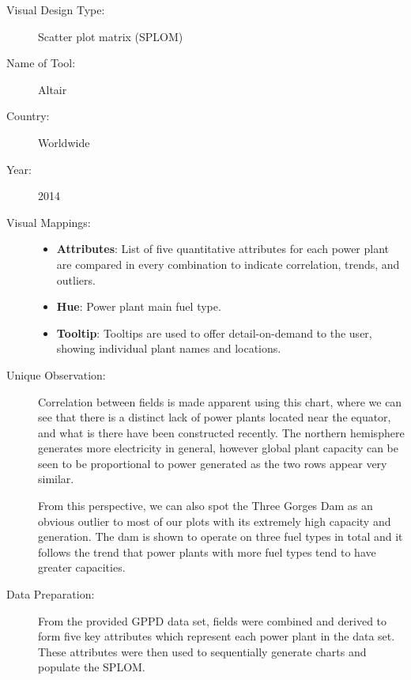\begin{description}
\item[Visual Design Type:]
Scatter plot matrix (SPLOM)
\item[Name of Tool:]
Altair
\item[Country:]
Worldwide
\item[Year:]
2014

\item[Visual Mappings:]
\begin{itemize}
  \item \textbf{Attributes}: List of five quantitative attributes for each power plant are compared in every combination to indicate correlation, trends, and outliers.
  \item \textbf{Hue}: Power plant main fuel type.
  \item \textbf{Tooltip}: Tooltips are used to offer detail-on-demand to the user, showing individual plant names and locations.
\end{itemize}

\item[Unique Observation:]
Correlation between fields is made apparent using this chart, where we can see that there is a distinct lack of power plants located near the equator, and what is there have been constructed recently. The northern hemisphere generates more electricity in general, however global plant capacity can be seen to be proportional to power generated as the two rows appear very similar.

From this perspective, we can also spot the Three Gorges Dam as an obvious outlier to most of our plots with its extremely high capacity and generation. The dam is shown to operate on three fuel types in total and it follows the trend that power plants with more fuel types tend to have greater capacities.

\item[Data Preparation:]
From the provided GPPD data set, fields were combined and derived to form five key attributes which represent each power plant in the data set. These attributes were then used to sequentially generate charts and populate the SPLOM.

\end{description}

